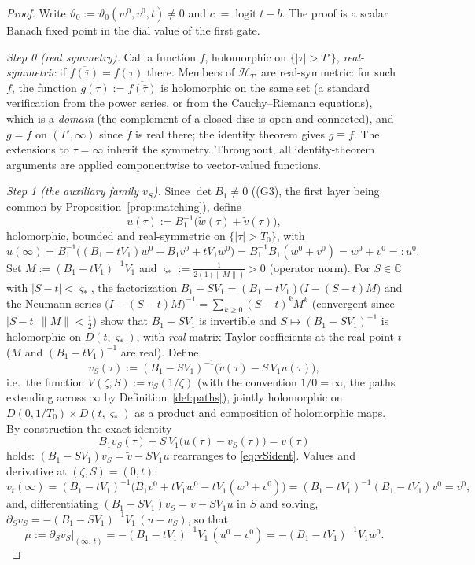 \documentclass[11pt]{article}
\theoremstyle{definition}
\theoremstyle{remark}
\theoremstyle{plain}
\newcommand{\C}{\mathbb{C}}
\newcommand{\cH}{\mathcal{H}}
\newcommand{\logit}{\operatorname{logit}}
\begin{document}
\begin{proof}
Write $\vartheta_0:=\vartheta_0(w^0,v^0,t)\neq0$ and $c:=\logit t-b$.  The proof is a
scalar Banach fixed point in the dial value of the first gate.

\emph{Step 0 (real symmetry).}  Call a function $f$, holomorphic on
$\{|\tau|>T'\}$, \emph{real-symmetric} if
$\overline{f(\bar\tau)}=f(\tau)$ there.  Members of $\cH_{T'}$ are real-symmetric: for
such $f$, the function $g(\tau):=\overline{f(\bar\tau)}$ is holomorphic on the same set
(a standard verification from the power series, or from the Cauchy--Riemann equations),
which is a \emph{domain} (the complement of a closed disc is open and connected), and
$g=f$ on $(T',\infty)$ since $f$ is real there; the identity theorem gives $g\equiv f$.
The extensions to $\tau=\infty$ inherit the symmetry.  Throughout, all identity-theorem
arguments are applied componentwise to vector-valued functions.

\emph{Step 1 (the auxiliary family $v_S$).}  Since $\det B_1\neq0$ ((G3), the first
layer being common by Proposition~\ref{prop:matching}), define
\[
u(\tau):=B_1^{-1}\big(\widetilde w(\tau)+\widetilde v(\tau)\big),
\]
holomorphic, bounded and real-symmetric on $\{|\tau|>T_0\}$, with
\[
u(\infty)=B_1^{-1}\big((B_1-tV_1)w^0+B_1v^0+tV_1w^0\big)
=B_1^{-1}B_1(w^0+v^0)=w^0+v^0=:u^0 .
\]
Set $M:=(B_1-tV_1)^{-1}V_1$ and $\varsigma_*:=\tfrac1{2(1+\|M\|)}>0$ (operator norm).
For $S\in\C$ with $|S-t|<\varsigma_*$, the factorization
$B_1-SV_1=(B_1-tV_1)\big(I-(S-t)M\big)$ and the Neumann series
$\big(I-(S-t)M\big)^{-1}=\sum_{k\ge0}(S-t)^kM^k$ (convergent since
$|S-t|\,\|M\|<\tfrac12$) show that $B_1-SV_1$ is invertible and
$S\mapsto(B_1-SV_1)^{-1}$ is holomorphic on $D(t,\varsigma_*)$, with \emph{real} matrix
Taylor coefficients at the real point $t$ ($M$ and $(B_1-tV_1)^{-1}$ are real).  Define
\[
v_S(\tau):=(B_1-SV_1)^{-1}\big(\widetilde v(\tau)-S\,V_1u(\tau)\big),
\]
i.e.\ the function $V(\zeta,S):=v_S(1/\zeta)$ (with the convention $1/0=\infty$,
the paths extending across $\infty$ by Definition~\ref{def:paths}), jointly holomorphic
on $D(0,1/T_0)\times D(t,\varsigma_*)$ as a product and composition of holomorphic
maps.  By construction the exact identity
\begin{equation}\label{eq:vSident}
B_1v_S(\tau)+S\,V_1\big(u(\tau)-v_S(\tau)\big)=\widetilde v(\tau)
\end{equation}
holds: $(B_1-SV_1)v_S=\widetilde v-SV_1u$ rearranges to \eqref{eq:vSident}.  Values
and derivative at $(\zeta,S)=(0,t)$:
\[
v_t(\infty)=(B_1-tV_1)^{-1}\big(B_1v^0+tV_1w^0-tV_1(w^0+v^0)\big)
=(B_1-tV_1)^{-1}(B_1-tV_1)v^0=v^0,
\]
and, differentiating $(B_1-SV_1)v_S=\widetilde v-SV_1u$ in $S$ and solving,
$\partial_Sv_S=-(B_1-SV_1)^{-1}V_1\,(u-v_S)$, so that
\begin{equation}\label{eq:mu}
\mu:=\partial_Sv_S\big|_{(\infty,\,t)}=-(B_1-tV_1)^{-1}V_1\,(u^0-v^0)
=-(B_1-tV_1)^{-1}V_1w^0 .
\end{equation}


\end{proof}
\end{document}
